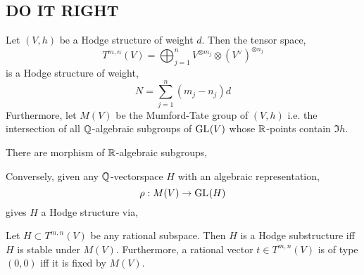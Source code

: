 \documentclass[12pt]{article}
\begin{document}
\subsection{DO IT RIGHT}

\begin{remark}
Let $(V, h)$ be a Hodge structure of weight $d$. Then the tensor space,
\[ T^{m,n}(V) = \bigoplus_{j = 1}^n V^{\otimes m_j} \otimes (V^\vee)^{\otimes n_j} \]
is a Hodge structure of weight,
\[ N = \sum_{j = 1}^n (m_j  - n_j) d \]
Furthermore, let $M(V)$ be the Mumford-Tate group of $(V, h)$ i.e. the intersection of all $\mathbb{Q}$-algebraic subgroups of $\mathrm{GL}_{}(V)$ whose $\mathbb{R}$-points contain $\Im{h}$. 
\end{remark}

\begin{lemma}
There are morphism of $\mathbb{R}$-algebraic subgroups,
\begin{center}
\end{center}
Conversely, given any $\mathbb{Q}$-vectorspace $H$ with an algebraic representation,
\[ \rho : M(V) \to \mathrm{GL}_{}(H) \]
gives $H$ a Hodge structure via,
\begin{center}
\end{center}
\end{lemma}

\begin{proposition}
Let $H \subset T^{m,n}(V)$ be any rational subspace. Then $H$ is a Hodge substructure iff $H$ is stable under $M(V)$. Furthermore, a rational vector $t \in T^{m,n}(V)$ is of type $(0,0)$ iff it is fixed by $M(V)$. 
\end{proposition}
\end{document}
